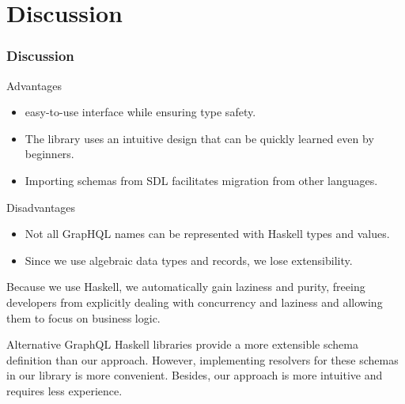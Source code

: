 \section{Discussion}

    
\begin{frame}[allowframebreaks]\frametitle{Discussion}

\begin{block}{Advantages}
\begin{itemize}
    \item easy-to-use interface while ensuring type safety.
    \item The library uses an intuitive design that can be quickly learned even by beginners.
    \item Importing schemas from SDL facilitates migration from other languages.
\end{itemize}
\end{block}

\begin{block}{Disadvantages}
\begin{itemize}
    \item Not all GrapHQL names can be represented with Haskell types and values.
    \item Since we use algebraic data types and records, we lose extensibility.
\end{itemize}
\end{block}

\vspace{40pt}

Because we use Haskell, we automatically gain laziness and purity, freeing developers from explicitly dealing with concurrency and laziness and allowing them to focus on business logic. 

Alternative GraphQL Haskell libraries provide a more extensible schema definition than our approach. However, implementing resolvers for these schemas in our library is more convenient. Besides, our approach is more intuitive and requires less experience.
    
\end{frame}

